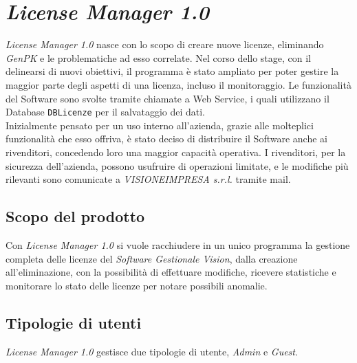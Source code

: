 
\chapter{\textit{License Manager 1.0}}
\label{cap:license-manager}

\textit{License Manager 1.0} nasce con lo scopo di creare nuove licenze, eliminando \textit{GenPK} e le problematiche ad esso correlate. Nel corso dello stage, con il delinearsi di nuovi obiettivi, il programma è stato ampliato per poter gestire la maggior parte degli aspetti di una licenza, incluso il monitoraggio. Le funzionalità del Software sono svolte tramite chiamate a Web Service, i quali utilizzano il Database \texttt{DBLicenze} per il salvataggio dei dati.
\\
Inizialmente pensato per un uso interno all'azienda, grazie alle molteplici funzionalità che esso offriva, è stato deciso di distribuire il Software anche ai rivenditori, concedendo loro una maggior capacità operativa.
I rivenditori, per la sicurezza dell'azienda, possono usufruire di operazioni limitate, e le modifiche più rilevanti sono comunicate a \textit{VISIONEIMPRESA s.r.l.} tramite mail.


\section{Scopo del prodotto}

Con \textit{License Manager 1.0} si vuole racchiudere in un unico programma la gestione completa delle licenze del \textit{Software Gestionale Vision}, dalla creazione all'eliminazione, con la possibilità di effettuare modifiche, ricevere statistiche e monitorare lo stato delle licenze per notare possibili anomalie. 


\section{Tipologie di utenti}

\textit{License Manager 1.0} gestisce due tipologie di utente, \textit{Admin} e \textit{Guest}.

